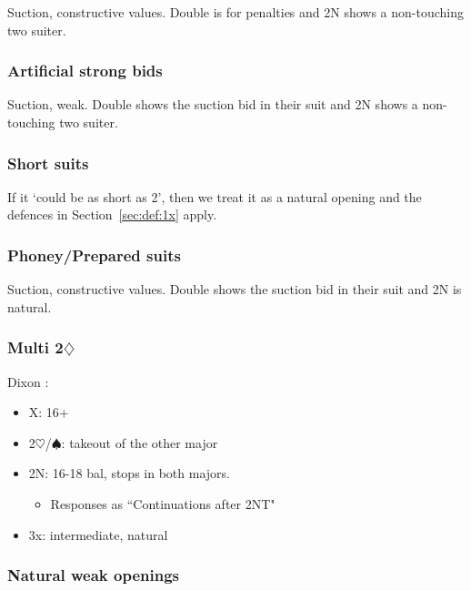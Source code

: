 \documentclass[a4paper,14pt]{extarticle}
\begin{document}
Suction, constructive values. Double is for penalties and 2N shows a
non-touching two suiter. 

\subsubsection{Artificial strong bids}
\label{sec:def:strong}

Suction, weak. Double shows the suction bid in their suit and 2N shows a
non-touching two suiter. 

\subsubsection{Short suits}
\label{sec:def:short}

If it `could be as short as 2', then we treat it as a natural opening and the
defences in Section~\ref{sec:def:1x} apply.

\subsubsection{Phoney/Prepared suits}
\label{sec:def:phoney}

Suction, constructive values. Double shows the suction bid in their suit and 2N
is natural. 

\newpage 

\subsubsection{Multi 2$\diamondsuit$}
\label{sec:def:multi}

\label{note:15}
Dixon :

\begin{itemize}
\item X: 16+
\item 2$\heartsuit$/$\spadesuit$: takeout of the other major
\item 2N: 16-18 bal, stops in both majors.
	\begin{itemize}
	\item Responses as ``Continuations after 2NT" 
	\end{itemize}
\item 3x: intermediate, natural
\end{itemize}

\subsubsection{Natural weak openings}
\label{sec:def:weak}
\end{document}
